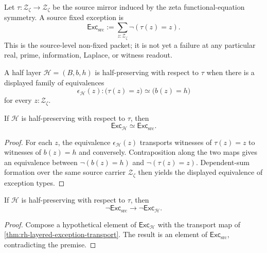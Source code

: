 \begin{definition}
\label{def:rh-layered-source-fixed-exception}
Let $\tau:\mathcal Z_{\zeta}\to\mathcal Z_{\zeta}$ be the source mirror
induced by the zeta functional-equation symmetry. A source fixed
exception is
$$
\mathsf{Exc}_{\mathrm{src}}
:=
\sum_{z:\mathcal Z_{\zeta}}\neg(\tau(z)=z).
$$
This is the source-level non-fixed packet; it is not yet a failure at any
particular real, prime, information, Laplace, or witness readout.
\end{definition}

\begin{definition}
\label{def:rh-layered-half-preserving-equivalence}
A half layer $\mathcal H=(B,b,h)$ is half-preserving with respect to
$\tau$ when there is a displayed family of equivalences
$$
\epsilon_{\mathcal H}(z):
\bigl(\tau(z)=z\bigr)\simeq\bigl(b(z)=h\bigr)
$$
for every $z:\mathcal Z_{\zeta}$.
\end{definition}

\begin{theorem}
\label{thm:rh-layered-exception-transport}
If $\mathcal H$ is half-preserving with respect to $\tau$, then
$$
\mathsf{Exc}_{\mathcal H}
\simeq
\mathsf{Exc}_{\mathrm{src}}.
$$
\end{theorem}

\begin{proof}
For each $z$, the equivalence
$\epsilon_{\mathcal H}(z)$ transports witnesses of
$\tau(z)=z$ to witnesses of $b(z)=h$ and conversely. Contraposition along
the two maps gives an equivalence between
$\neg(b(z)=h)$ and $\neg(\tau(z)=z)$. Dependent-sum formation over the
same source carrier $\mathcal Z_{\zeta}$ then yields the displayed
equivalence of exception types.
\end{proof}

\begin{theorem}
\label{thm:rh-layered-no-exception-transfer}
If $\mathcal H$ is half-preserving with respect to $\tau$, then
$$
\neg\mathsf{Exc}_{\mathrm{src}}
\to
\neg\mathsf{Exc}_{\mathcal H}.
$$
\end{theorem}

\begin{proof}
Compose a hypothetical element of $\mathsf{Exc}_{\mathcal H}$ with the
transport map of \autoref{thm:rh-layered-exception-transport}. The result
is an element of $\mathsf{Exc}_{\mathrm{src}}$, contradicting the premise.
\end{proof}

